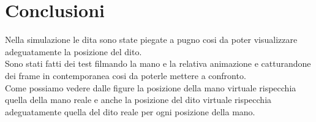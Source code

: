 \section{Conclusioni}

Nella simulazione le dita sono state piegate a pugno cosi da poter visualizzare adeguatamente la posizione del dito.\\

Sono stati fatti dei test filmando la mano e la relativa animazione e catturandone dei frame in contemporanea cosi da poterle mettere a confronto.\\

Come possiamo vedere dalle figure la posizione della mano virtuale rispecchia quella della mano reale e anche la posizione del dito virtuale rispecchia adeguatamente quella del dito reale per ogni posizione della mano.\\\\


\clearpage